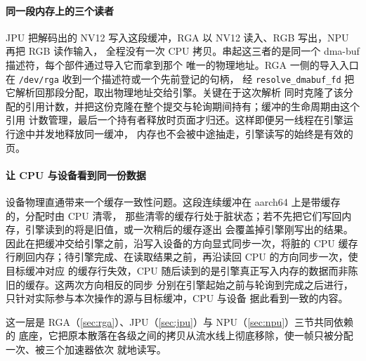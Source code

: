 \paragraph{同一段内存上的三个读者}
JPU 把解码出的 NV12 写入这段缓冲，RGA 以 NV12 读入、RGB 写出，NPU 再把 RGB 读作输入，
全程没有一次 CPU 拷贝。串起这三者的是同一个 dma-buf 描述符，每个部件通过导入它而拿到那个
唯一的物理地址。RGA 一侧的导入入口在 \texttt{/dev/rga} 收到一个描述符或一个先前登记的句柄，
经 \texttt{resolve\_dmabuf\_fd} 把它解析回那段分配，取出物理地址交给引擎。关键在于这次解析
同时克隆了该分配的引用计数，并把这份克隆在整个提交与轮询期间持有；缓冲的生命周期由这个引用
计数管理，最后一个持有者释放时页面才归还。这样即便另一线程在引擎运行途中并发地释放同一缓冲，
内存也不会被中途抽走，引擎读写的始终是有效的页。

\paragraph{让 CPU 与设备看到同一份数据}
设备物理直通带来一个缓存一致性问题。这段连续缓冲在 aarch64 上是带缓存的，分配时由 CPU 清零，
那些清零的缓存行处于脏状态；若不先把它们写回内存，引擎读到的将是旧值，或一次稍后的缓存逐出
会覆盖掉引擎刚写出的结果。因此在把缓冲交给引擎之前，沿写入设备的方向显式同步一次，将脏的
CPU 缓存行刷回内存；待引擎完成、在读取结果之前，再沿读回 CPU 的方向同步一次，使目标缓冲对应
的缓存行失效，CPU 随后读到的是引擎真正写入内存的数据而非陈旧的缓存。这两次方向相反的同步
分别在引擎起始之前与轮询到完成之后进行，只针对实际参与本次操作的源与目标缓冲，CPU 与设备
据此看到一致的内容。

这一层是 RGA（\ref{sec:rga}）、JPU（\ref{sec:jpu}）与 NPU（\ref{sec:npu}）三节共同依赖的
底座，它把原本散落在各级之间的拷贝从流水线上彻底移除，使一帧只被分配一次、被三个加速器依次
就地读写。
